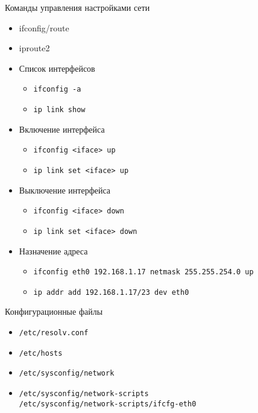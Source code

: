 \begin{frame}{Команды управления настройками сети}
	\begin{itemize}
	  \item ifconfig/route
	  \item iproute2
	\end{itemize}

	\begin{itemize}
		\item Список интерфейсов
			\begin{itemize}
				\item {\tt ifconfig -a}
				\item {\tt ip link show}
			\end{itemize}
		\item Включение интерфейса 
			\begin{itemize}
				\item {\tt ifconfig <iface> up}
				\item {\tt ip link set <iface> up}
			\end{itemize}
	  \item Выключение интерфейса
			\begin{itemize}
				\item {\tt ifconfig <iface> down}
				\item {\tt ip link set <iface> down}
			\end{itemize}
	  \item Назначение адреса
			\begin{itemize}
				\item {\tt ifconfig eth0 192.168.1.17 netmask 255.255.254.0 up}
				\item {\tt ip addr add 192.168.1.17/23 dev eth0}
			\end{itemize}
	\end{itemize}
\end{frame}

\begin{frame}{Конфигурационные файлы}
  \begin{itemize}
    \item {\tt /etc/resolv.conf}
    \item {\tt /etc/hosts}
	\item {\tt /etc/sysconfig/network}
    \item {\tt /etc/sysconfig/network-scripts}\\
		{\tt /etc/sysconfig/network-scripts/ifcfg-eth0}
  \end{itemize}
\end{frame}

